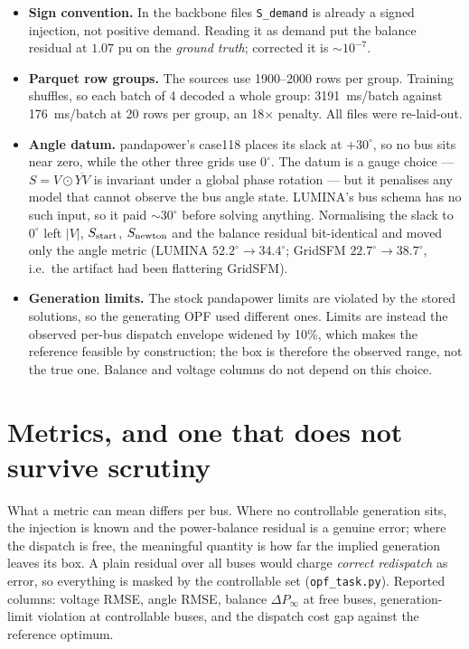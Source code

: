 \documentclass[10pt]{article}
\begin{document}
\begin{itemize}\itemsep2pt
\item \textbf{Sign convention.} In the backbone files \texttt{S\_demand} is
already a signed injection, not positive demand. Reading it as demand put the
balance residual at \(1.07\) pu on the \emph{ground truth}; corrected it is
\(\sim\!10^{-7}\).
\item \textbf{Parquet row groups.} The sources use 1900--2000 rows per group.
Training shuffles, so each batch of 4 decoded a whole group: 3191~ms/batch
against 176~ms/batch at 20 rows per group, an 18\(\times\) penalty. All files
were re-laid-out.
\item \textbf{Angle datum.} pandapower's case118 places its slack at
\(+30^\circ\), so no bus sits near zero, while the other three grids use
\(0^\circ\). The datum is a gauge choice --- \(S = V\odot\overline{YV}\) is
invariant under a global phase rotation --- but it penalises any model that
cannot observe the bus angle state. LUMINA's bus schema has no such input, so it
paid \(\sim\!30^\circ\) before solving anything. Normalising the slack to
\(0^\circ\) left \(|V|\), \(S_{\rm start}\), \(S_{\rm newton}\) and the balance
residual bit-identical and moved only the angle metric
(LUMINA \(52.2^\circ \rightarrow 34.4^\circ\); GridSFM \(22.7^\circ \rightarrow
38.7^\circ\), i.e.\ the artifact had been flattering GridSFM).
\item \textbf{Generation limits.} The stock pandapower limits are violated by the
stored solutions, so the generating OPF used different ones. Limits are instead
the observed per-bus dispatch envelope widened by 10\%, which makes the
reference feasible by construction; the box is therefore the observed range, not
the true one. Balance and voltage columns do not depend on this choice.
\end{itemize}

\section{Metrics, and one that does not survive scrutiny}
\label{sec:metrics}

What a metric can mean differs per bus. Where no controllable generation sits,
the injection is known and the power-balance residual is a genuine error; where
the dispatch is free, the meaningful quantity is how far the implied generation
leaves its box. A plain residual over all buses would charge \emph{correct
redispatch} as error, so everything is masked by the controllable set
(\texttt{opf\_task.py}). Reported columns: voltage RMSE, angle RMSE, balance
\(\Delta P_\infty\) at free buses, generation-limit violation at controllable
buses, and the dispatch cost gap against the reference optimum.
\end{document}
